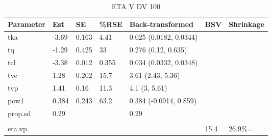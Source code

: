 \begin{table}
\centering\centering
\caption{ETA V DV 100}
\centering
\fontsize{8}{10}\selectfont
\begin{tabular}[t]{lllllll}
\toprule
\textbf{Parameter} & \textbf{Est} & \textbf{SE} & \textbf{\%RSE} & \textbf{Back-transformed} & \textbf{BSV} & \textbf{Shrinkage}\\
\midrule
tka & -3.69 & 0.163 & 4.41 & 0.025 (0.0182, 0.0344) &  & \\
\midrule
tq & -1.29 & 0.425 & 33 & 0.276 (0.12, 0.635) &  & \\
\midrule
tcl & -3.38 & 0.012 & 0.355 & 0.034 (0.0332, 0.0348) &  & \\
\midrule
tvc & 1.28 & 0.202 & 15.7 & 3.61 (2.43, 5.36) &  & \\
\midrule
tvp & 1.41 & 0.16 & 11.3 & 4.1 (3, 5.61) &  & \\
\midrule
pow1 & 0.384 & 0.243 & 63.2 & 0.384 (-0.0914, 0.859) &  & \\
\midrule
prop.sd & 0.29 &  &  & 0.29 &  & \\
\midrule\\
eta.vp &  &  &  &  & 15.4 & 26.9\%=\\
\bottomrule
\end{tabular}
\end{table}